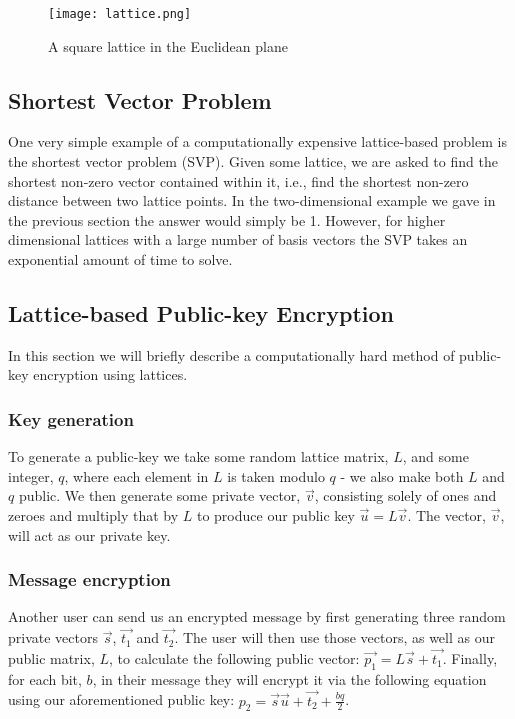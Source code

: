 \documentclass[journal]{IEEEtran}
\begin{document}
\begin{figure}[!t]
\centering
\texttt{[image: lattice.png]}
\caption{A square lattice in the Euclidean plane}
\label{fig_sim}
\end{figure}

\subsection{Shortest Vector Problem}

One very simple example of a computationally expensive lattice-based problem is the shortest vector problem (SVP). Given some lattice, we are asked to find the shortest non-zero vector contained within it, i.e., find the shortest non-zero distance between two lattice points. In the two-dimensional example we gave in the previous section the answer would simply be 1. However, for higher dimensional lattices with a large number of basis vectors the SVP takes an exponential amount of time to solve.

\subsection{Lattice-based Public-key Encryption}

In this section we will briefly describe a computationally hard method of public-key encryption using lattices.

\subsubsection{Key generation}

To generate a public-key we take some random lattice matrix, $L$, and some integer, $q$, where each element in $L$ is taken modulo $q$ - we also make both $L$ and $q$ public. We then generate some private vector, $\vec{v}$, consisting solely of ones and zeroes and multiply that by $L$ to produce our public key $\vec{u} = L\vec{v}$. The vector, $\vec{v}$, will act as our private key.

\subsubsection{Message encryption}

Another user can send us an encrypted message by first generating three random private vectors $\vec{s}$, $\vec{t_1}$ and $\vec{t_2}$. The user will then use those vectors, as well as our public matrix, $L$, to calculate the following public vector: $\vec{p_1} = L\vec{s} + \vec{t_1}$. Finally, for each bit, $b$, in their message they will encrypt it via the following equation using our aforementioned public key: $p_2 = \vec{s} \vec{u} + \vec{t_2} + \frac{bq}{2}$.
\end{document}
